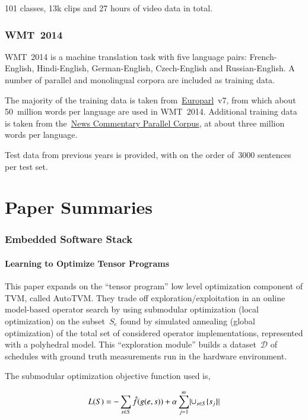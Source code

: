 \documentclass[a4paper, 12pt]{article}
\DeclarePairedDelimiter\abs{\lvert}{\rvert}%
\begin{document}
101 classes, 13k clips and 27 hours of video data in total.


\section{WMT~2014~\citet{wmt14-translation-website}}
\label{wmt2014}

WMT~2014 is a machine translation task with five language pairs:
French-English, Hindi-English, German-English, Czech-English and
Russian-English. A number of parallel and monolingual corpora are included as
training data.

The majority of the training data is taken
from~\href{http://www.statmt.org/europarl/}{Europarl}~v7, from which about
50~million words per language are used in WMT~2014. Additional training data is
taken from the~\href{http://www.casmacat.eu/corpus/news-commentary.html}{News
Commentary Parallel Corpus}, at about three million words per language.

Test data from previous years is provided, with on the order of~\num{3000}
sentences per test set.


\part{Paper Summaries}


\section{Embedded Software Stack}

\subsection{Learning to Optimize Tensor Programs~\cite{chen2018learning}}

This paper expands on the ``tensor program'' low level optimization component
of TVM, called AutoTVM. They trade off exploration/exploitation in an online
model-based operator search by using submodular optimization (local
optimization) on the subset~$S_e$ found by simulated annealing (global
optimization) of the total set of considered operator implementations,
represented with a polyhedral model. This ``exploration module'' builds a
dataset~$\mathcal{D}$ of schedules with ground truth measurements run in the
hardware environment.

The submodular optimization objective function used is,

\begin{equation}
        L(S) = - \sum_{s \in S} \hat{f}(g(e, s)) + \alpha \sum_{j = 1}^m \abs{\cup_{s \in S} \{s_j\}}
\end{equation}
\end{document}
